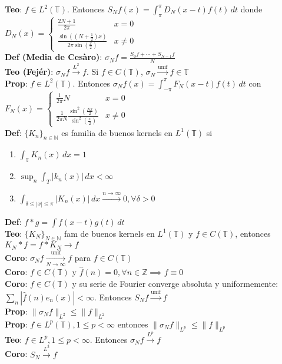 \documentclass[9pt]{extarticle}
\newcommand{\N}{\mathbb{N}}
\newcommand{\Z}{\mathbb{Z}}
\newcommand{\T}{\mathbb{T}}
\begin{document}
\begin{multicols*}{2}
\textbf{Teo}: $f\in L^2(\T)$. Entonces $S_N f(x)=\int_\pi^\pi D_N(x-t)f(t)\,dt$ donde $D_N(x)=\begin{cases}
	\frac{2N+1}{2\pi}&x=0\\
	\frac{\sin((N+\frac{1}{2})x)}{2\pi \sin(\frac{x}{2})}&x\neq 0
\end{cases}$\\
\textbf{Def (Media de Cesàro)}: $\sigma_N f=\frac{S_0f+\cdots+S_{N-1}f}{N}$\\
\textbf{Teo (Fejér)}: $\sigma_Nf\xrightarrow{L^2}f$. Si $f\in C(\T)$, $\sigma_N\xrightarrow{\text{unif}}f\in \T$\\
\textbf{Prop}: $f\in L^2(\T)$. Entonces $\sigma_N f(x)=\int_{-\pi}^\pi F_N(x-t)f(t)\,dt$ con $F_N(x)=\begin{cases}
	\frac{1}{2\pi}N &x=0\\
	\frac{1}{2\pi N}\frac{\sin^2(\frac{Nx}{2})}{\sin^2(\frac{x}{2})}&x\neq 0
\end{cases}$\\
\textbf{Def}: $\{K_n\}_{n\in\N}$ es familia de buenos kernels en $L^1(\T)$ si \begin{enumerate}
	\item $\int_\T K_n(x)\,dx=1$
	\item $\sup_n\int_T|k_n(x)|\,dx<\infty$
	\item $\int_{\delta\leq |x|\leq \pi} |K_n(x)|\,dx\xrightarrow{n\to\infty}0,\forall\delta>0$
\end{enumerate}
\textbf{Def}: $f*g=\int f(x-t)g(t)\,dt$\\
\textbf{Teo}: $\{K_N\}_{N\in\N}$ fam de buenos kernels en $L^1(\T)$ y $f\in C(\T)$, entonces $K_N*f=f*K_N\to f$\\
\textbf{Coro}: $\sigma_N f\xrightarrow[N\to\infty]{\text{unif}} f$ para $f\in C(\T)$\\
\textbf{Coro}: $f\in C(\T)$ y $\hat f(n)=0,\forall n\in\Z\implies f\equiv 0$\\
\textbf{Coro}: $f\in C(\T)$ y su serie de Fourier converge absoluta y uniformemente: $\sum_n |\hat f(n)e_n(x)|<\infty$. Entonces $S_N f\xrightarrow{\text{unif}} f$\\
\textbf{Prop}: $\|\sigma_N f\|_{L^2}\leq \|f\|_{L^2}$\\
\textbf{Prop}: $f\in L^p(\T), 1\leq p<\infty$ entonces $\|\sigma_N f\|_{L^p}\leq \|f\|_{L^p}$\\
\textbf{Teo}: $f\in L^p, 1\leq p<\infty$. Entonces $\sigma_N f\xrightarrow{L^p} f$\\
\textbf{Coro}: $S_N\xrightarrow{L^2} f$\\

\end{multicols*}
\end{document}
